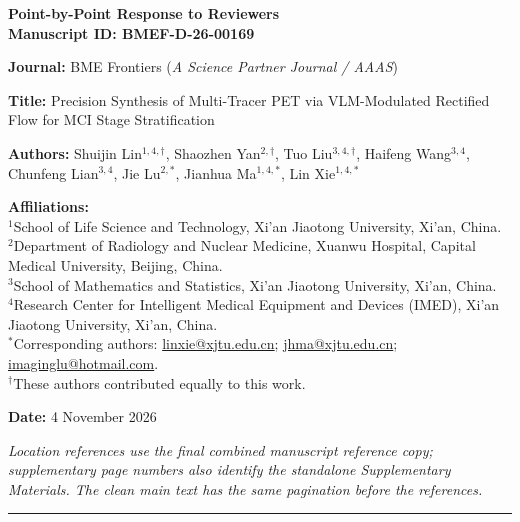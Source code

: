 \documentclass[11pt]{article}
\begin{document}
\thispagestyle{empty}

\vspace*{0.8cm}
{\LARGE\bfseries\color{HeaderColor}
  Point-by-Point Response to Reviewers\\[6pt]
  \large\normalfont\color{black}
  Manuscript ID: \textbf{BMEF-D-26-00169}
}

\vspace{0.6cm}
\noindent\textbf{Journal:} BME Frontiers (\textit{A Science Partner Journal / AAAS})

\noindent\textbf{Title:} Precision Synthesis of Multi-Tracer PET via VLM-Modulated Rectified Flow for MCI Stage Stratification

\noindent\textbf{Authors:} Shuijin Lin$^{1,4,\dagger}$, Shaozhen Yan$^{2,\dagger}$, Tuo Liu$^{3,4,\dagger}$, Haifeng Wang$^{3,4}$, Chunfeng Lian$^{3,4}$, Jie Lu$^{2,*}$, Jianhua Ma$^{1,4,*}$, Lin Xie$^{1,4,*}$

\noindent\textbf{Affiliations:}\\
{\small
$^1$School of Life Science and Technology, Xi'an Jiaotong University, Xi'an, China.\\
$^2$Department of Radiology and Nuclear Medicine, Xuanwu Hospital, Capital Medical University, Beijing, China.\\
$^3$School of Mathematics and Statistics, Xi'an Jiaotong University, Xi'an, China.\\
$^4$Research Center for Intelligent Medical Equipment and Devices (IMED), Xi'an Jiaotong University, Xi'an, China.\\
$^*$Corresponding authors: \href{mailto:linxie@xjtu.edu.cn}{linxie@xjtu.edu.cn}; \href{mailto:jhma@xjtu.edu.cn}{jhma@xjtu.edu.cn}; \href{mailto:imaginglu@hotmail.com}{imaginglu@hotmail.com}.\\
$^\dagger$These authors contributed equally to this work.
}

\noindent\textbf{Date:} 4 November 2026

\noindent\textit{Location references use the final combined manuscript reference copy; supplementary page numbers also identify the standalone Supplementary Materials. The clean main text has the same pagination before the references.}\par

\vspace{0.8cm}
\noindent\rule{\linewidth}{1.2pt}



\clearpage


\clearpage


\clearpage


\clearpage


\clearpage


\end{document}

